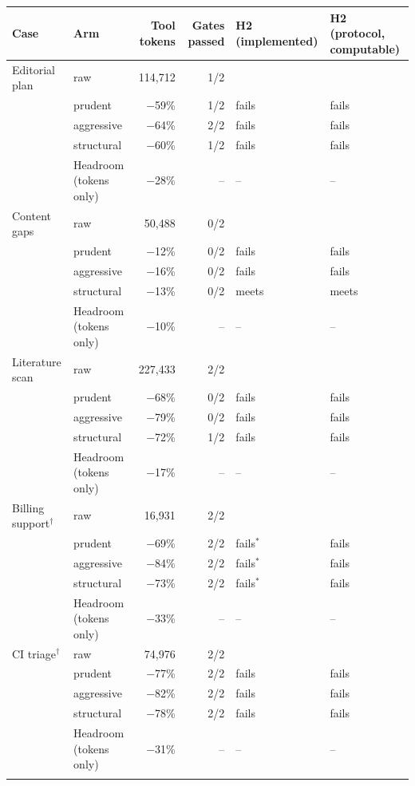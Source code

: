 \begin{tabular}{llrrll}
\toprule
Case & Arm & Tool tokens & Gates passed & H2 (implemented) & H2 (protocol, computable) \\
\midrule
Editorial plan & raw & 114{,}712 & 1/2 &  &  \\
 & prudent & $-$59\% & 1/2 & fails & fails \\
 & aggressive & $-$64\% & 2/2 & fails & fails \\
 & structural & $-$60\% & 1/2 & fails & fails \\
 & Headroom (tokens only) & $-$28\% & -- & -- & -- \\
\addlinespace
Content gaps & raw & 50{,}488 & 0/2 &  &  \\
 & prudent & $-$12\% & 0/2 & fails & fails \\
 & aggressive & $-$16\% & 0/2 & fails & fails \\
 & structural & $-$13\% & 0/2 & meets & meets \\
 & Headroom (tokens only) & $-$10\% & -- & -- & -- \\
\addlinespace
Literature scan & raw & 227{,}433 & 2/2 &  &  \\
 & prudent & $-$68\% & 0/2 & fails & fails \\
 & aggressive & $-$79\% & 0/2 & fails & fails \\
 & structural & $-$72\% & 1/2 & fails & fails \\
 & Headroom (tokens only) & $-$17\% & -- & -- & -- \\
\addlinespace
Billing support$^\dagger$ & raw & 16{,}931 & 2/2 &  &  \\
 & prudent & $-$69\% & 2/2 & fails$^{\ast}$ & fails \\
 & aggressive & $-$84\% & 2/2 & fails$^{\ast}$ & fails \\
 & structural & $-$73\% & 2/2 & fails$^{\ast}$ & fails \\
 & Headroom (tokens only) & $-$33\% & -- & -- & -- \\
\addlinespace
CI triage$^\dagger$ & raw & 74{,}976 & 2/2 &  &  \\
 & prudent & $-$77\% & 2/2 & fails & fails \\
 & aggressive & $-$82\% & 2/2 & fails & fails \\
 & structural & $-$78\% & 2/2 & fails & fails \\
 & Headroom (tokens only) & $-$31\% & -- & -- & -- \\
\addlinespace
\bottomrule
\end{tabular}
